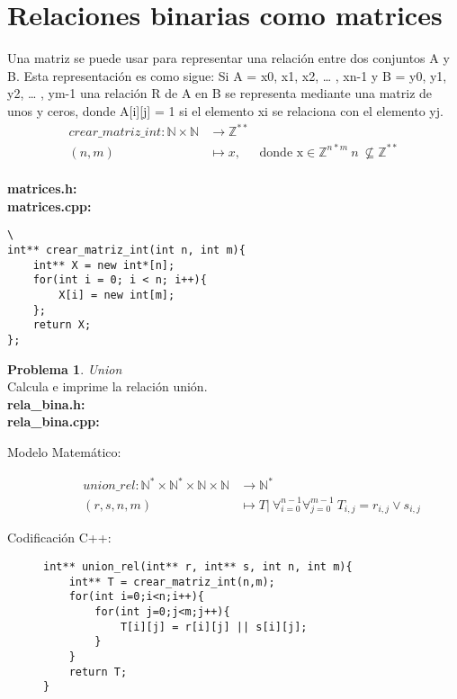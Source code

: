 \documentclass{article}
\theoremstyle{plain}
\theoremstyle{definition}
\newtheorem{problem}{Problema}
\begin{document}
\section{Relaciones binarias como matrices}
\begin{description}
Una matriz se puede usar para representar una relación entre dos conjuntos A y B. Esta representación es como sigue:
Si A = {x0, x1, x2, … , xn-1} y B = { y0, y1, y2, … , ym-1} una relación R de A en B se representa mediante una matriz de unos y ceros, donde A[i][j] = 1 si el elemento xi se relaciona con el elemento yj.
\begin{align*}
crear\_matriz\_int: \mathbb{N}\times\mathbb{N} &\to \mathbb{Z}^{**}\\
(n,m) &\mapsto x,& \text{donde x} \in \mathbb{Z}^{n*m} \ n\ \not\subseteq \mathbb{Z}^{**}
\end{align*}\\
\textbf{matrices.h:}\ \\
\textbf{matrices.cpp:}\ 
%
\item[Codificación \textsf{C++}:]\hfill 
%
\begin{verbatim}\
int** crear_matriz_int(int n, int m){
    int** X = new int*[n];
    for(int i = 0; i < n; i++){
        X[i] = new int[m];
    };
    return X;
};
\end{verbatim}
\end{description}
%
\begin{problem}\emph{Union}\\
Calcula e imprime la relación unión.\\
\textbf{rela\_bina.h:}\ \\
\textbf{rela\_bina.cpp:}\ 
%
\begin{description}
\item[Modelo Matemático:]
%
\begin{align*}
union\_rel: \mathbb{N}^*\times\mathbb{N}^*\times\mathbb{N}\times\mathbb{N} &\to \mathbb{N}^*\\
(r,s,n,m) &\mapsto T|\ \forall_{i=0}^{n-1} \forall_{j=0}^{m-1}\ T_{i,j} = r_{i,j} \vee s_{i,j}
\end{align*}
%
\item[Codificación \textsf{C++}:]\hfill
%
\begin{verbatim}
int** union_rel(int** r, int** s, int n, int m){
    int** T = crear_matriz_int(n,m);
    for(int i=0;i<n;i++){
        for(int j=0;j<m;j++){
            T[i][j] = r[i][j] || s[i][j];
        }
    }
    return T;
}
\end{verbatim}
\end{description}
\end{problem}
\end{document}
